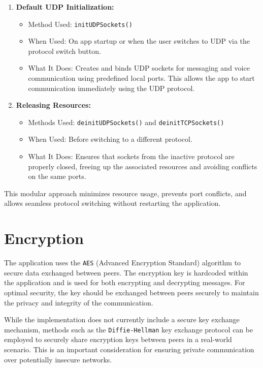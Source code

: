 \documentclass{article}
\begin{document}
\begin{enumerate}
\item \textbf{Default UDP Initialization:}
        \begin{itemize}  
        \item Method Used: \texttt{initUDPSockets()}
        \item When Used: On app startup or when the user switches to UDP via the protocol switch button.
        \item What It Does: Creates and binds UDP sockets for messaging and voice communication using predefined local ports. This allows the app to start 
        communication immediately using the UDP protocol.
        \end{itemize}

\item \textbf{Releasing Resources:}
        \begin{itemize}
        \item Methods Used: \texttt{deinitUDPSockets()} and \texttt{deinitTCPSockets()} 
        \item When Used: Before switching to a different protocol.
        \item What It Does: Ensures that sockets from the inactive protocol are properly closed, freeing up the associated resources and avoiding conflicts on the same ports.
        \end{itemize}
\end{enumerate}
This modular approach minimizes resource usage, prevents port conflicts, and allows seamless protocol switching without restarting the application.\

\section{Encryption}
The application uses the \texttt{AES} (Advanced Encryption Standard) algorithm to secure data exchanged between peers. The encryption key is hardcoded within the application and is used for both encrypting and decrypting messages. For optimal security, the key should be exchanged between peers securely to maintain the privacy and integrity of the communication.

While the implementation does not currently include a secure key exchange mechanism, methods such as the \texttt{Diffie-Hellman} key exchange protocol can be employed to securely share encryption keys between peers in a real-world scenario. This is an important consideration for ensuring private communication over potentially insecure networks.
\end{document}
